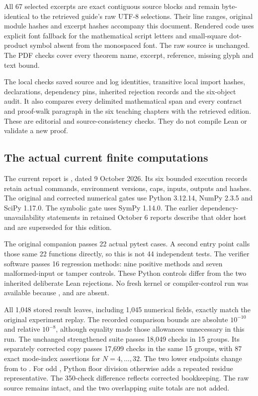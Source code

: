 All 67 selected excerpts are exact contiguous source blocks and remain byte-identical to the retrieved guide's raw UTF-8 selections. Their line ranges, original module hashes and excerpt hashes accompany this document. Rendered code uses explicit font fallback for the mathematical script letters and small-square dot-product symbol absent from the monospaced font. The raw source is unchanged. The PDF checks cover every theorem name, excerpt, reference, missing glyph and text bound.

The local  checks saved source and log identities, transitive local import hashes, declarations, dependency pins, inherited rejection records and the six-object audit. It also compares every delimited mathematical span and every contract and proof-walk paragraph in the six teaching chapters with the retrieved edition. These are editorial and source-consistency checks. They do not compile Lean or validate a new proof.

\subsection{The actual current finite computations}
The current report is , dated 9 October 2026. Its six bounded execution records retain actual commands, environment versions, caps, inputs, outputs and hashes. The original and corrected numerical gates use Python 3.12.14, NumPy 2.3.5 and SciPy 1.17.0. The symbolic gate uses SymPy 1.14.0. The earlier dependency-unavailability statements in retained October 6 reports describe that older host and are superseded for this edition.

The original companion passes 22 actual pytest cases. A second entry point calls those same 22 functions directly, so this is not 44 independent tests. The verifier software passes 16 regression methods: nine positive methods and seven malformed-input or tamper controls. These Python controls differ from the two inherited deliberate Lean rejections. No fresh kernel or compiler-control run was available because ,  and  are absent.

All 1,048 stored result leaves, including 1,045 numerical fields, exactly match the original experiment replay. The recorded comparison bounds are absolute $10^{-10}$ and relative $10^{-8}$, although equality made those allowances unnecessary in this run. The unchanged strengthened suite passes 18,049 checks in 15 groups. Its separately corrected copy passes 17,699 checks in the same 15 groups, with 87 exact mode-index assertions for $N=4,\ldots,32$. The two lower endpoints change from  to . For odd , Python floor division otherwise adds a repeated residue representative. The 350-check difference reflects corrected bookkeeping. The raw source remains intact, and the two overlapping suite totals are not added.


